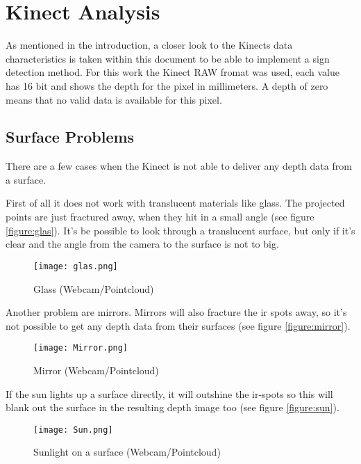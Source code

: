 \chapter{Kinect Analysis}
\graphicspath{{./KinectData/img/}}

As mentioned in the introduction, a closer look to the Kinects data characteristics is taken
within this document to be able to implement a sign detection method. 
For this work the Kinect RAW fromat was used, each value has 16 bit and shows the
depth for the pixel in millimeters. A depth of zero means that no valid data is available for
this pixel.

\section{Surface Problems}

There are a few cases when the Kinect is not able to deliver any depth data from a surface.

First of all it does not work with translucent materials like glass. The projected
points are just fractured away, when they hit in a small angle (see figure \vref{figure:glas}). 
It's be possible to look through a translucent surface, but only if it's clear and the angle from the 
camera to the surface is not to big.
\begin{figure}[htp]
\begin{center}
  \texttt{[image: glas.png]} 
  \caption{Glass (Webcam/Pointcloud)}
  \label{figure:glas}
\end{center}
\end{figure}
 
Another problem are mirrors. Mirrors will also fracture the ir spots away, 
so it's not possible to get any depth data from their surfaces (see figure \vref{figure:mirror}).
\begin{figure}[htp]
\begin{center}
  \texttt{[image: Mirror.png]}
  \caption{Mirror (Webcam/Pointcloud)}
  \label{figure:mirror}
\end{center}
\end{figure}

If the sun lights up a surface directly, it will outshine the ir-spots so this will blank out the surface
in the resulting depth image too (see figure \vref{figure:sun}).
\begin{figure}[htp]
\begin{center}
  \texttt{[image: Sun.png]}
  \caption{Sunlight on a surface (Webcam/Pointcloud)}
  \label{figure:sun}
\end{center}
\end{figure}

